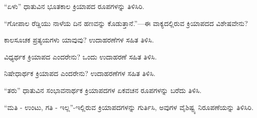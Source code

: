 \vspace{2.5pt plus 3pt minus 0.5pt}\noindent\hspace*{1.2em}\hspace{0.55em}“ಏಳು” ಧಾತುವಿನ ಭೂತಕಾಲ ಕ್ರಿಯಾಪದ ರೂಪಗಳನ್ನು ತಿಳಿಸಿರಿ.\par

\vspace{2.5pt plus 3pt minus 0.5pt}\noindent\hspace*{1.2em}\hspace{0.55em}“ಗೋಪಾಲ ರೆಡ್ಡಿಯು ನಾಳೆಯ ದಿನ ಹಣವನ್ನು ಕೊಡುತ್ತಾನೆ.”—ಈ ವಾಕ್ಯದಲ್ಲಿರುವ ಕ್ರಿಯಾಪದದ ವಿಶೇಷವೇನು?\par

\vspace{2.5pt plus 3pt minus 0.5pt}\noindent\hspace*{1.2em}\hspace{0.55em}ಕಾಲಸೂಚಕ ಪ್ರತ್ಯಯಗಳು ಯಾವುವು? ಉದಾಹರಣೆಗಳ ಸಹಿತ ತಿಳಿಸಿ.\par

\vspace{2.5pt plus 3pt minus 0.5pt}\noindent\hspace*{1.2em}\hspace{0.55em}ವಿಧ್ಯರ್ಥಕ ಕ್ರಿಯಾಪದ ಎಂದರೇನು? ಒಂದು ಉದಾಹರಣೆ ಸಹಿತ ತಿಳಿಸಿ.\par

\vspace{2.5pt plus 3pt minus 0.5pt}\noindent\hspace*{1.2em}\hspace{0.55em}ನಿಷೇಧಾರ್ಥಕ ಕ್ರಿಯಾಪದ ಎಂದರೇನು? ಉದಾಹರಣೆಗಳ ಸಹಿತ ತಿಳಿಸಿ.\par

\vspace{2.5pt plus 3pt minus 0.5pt}\noindent\hspace*{1.2em}\hspace{0.55em}“ತರು” ಧಾತುವಿನ ಸಂಭಾವನಾರ್ಥಕ ಕ್ರಿಯಾಪದಗಳ ಏಕವಚನ ರೂಪಗಳನ್ನು ಬರೆದು ತಿಳಿಸಿ.\par

\vspace{2.5pt plus 3pt minus 0.5pt}\noindent\hspace*{1.2em}\hspace{0.55em}“ಮತಿ - ಉಂಟು, ಗತಿ - ಇಲ್ಲ”-ಇಲ್ಲಿರುವ ಕ್ರಿಯಾಪದಗಳನ್ನು ಗುರ್ತಿಸಿ, ಅವುಗಳ ವೈಶಿಷ್ಟ್ಯ ನಿರೂಪಣೆಯನ್ನು ತಿಳಿಸಿರಿ.\par
